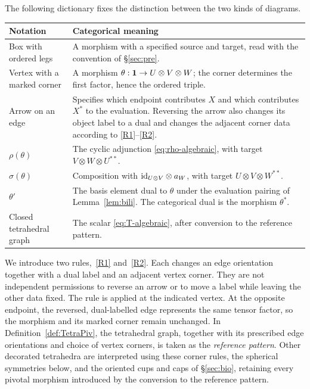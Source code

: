 \documentclass{amsart}
\begin{document}
The following dictionary fixes the distinction between the two kinds of diagrams.
\begin{center}
\renewcommand{\arraystretch}{1.22}
\begin{tabular}{p{}p{}}
\hline
Notation & Categorical meaning \\
\hline
Box with ordered legs & A morphism with a specified source and target, read with the convention of \S\ref{sec:pre}. \\
Vertex with a marked corner & A morphism $\theta:{\bf 1}\to U\otimes V\otimes W$; the corner determines the first factor, hence the ordered triple. \\
Arrow on an edge & Specifies which endpoint contributes $X$ and which contributes $X^*$ to the evaluation. Reversing the arrow also changes its object label to a dual and changes the adjacent corner data according to \eqref{R1}--\eqref{R2}. \\
$\rho(\theta)$ & The cyclic adjunction \eqref{eq:rho-algebraic}, with target $V\otimes W\otimes U^{**}$. \\
$\sigma(\theta)$ & Composition with $\mathrm{id}_{U\otimes V}\otimes a_W$, with target $U\otimes V\otimes W^{**}$. \\
$\theta'$ & The basis element dual to $\theta$ under the evaluation pairing of Lemma~\ref{lem:bili}. The categorical dual is the morphism $\theta^*$. \\
Closed tetrahedral graph & The scalar \eqref{eq:T-algebraic}, after conversion to the reference pattern. \\
\hline
\end{tabular}
\end{center}

We introduce two rules,~\eqref{R1} and~\eqref{R2}. Each changes an edge orientation together with a dual label and an adjacent vertex corner. They are not independent permissions to reverse an arrow or to move a label while leaving the other data fixed. The rule is applied at the indicated vertex. At the opposite endpoint, the reversed, dual-labelled edge represents the same tensor factor, so the morphism and its marked corner remain unchanged.
In Definition~\ref{def:TetraPiv}, the tetrahedral graph, together with its prescribed edge orientations and choice of vertex corners, is taken as the \emph{reference pattern}. Other decorated tetrahedra are interpreted using these corner rules, the spherical symmetries below, and the oriented cups and caps of \S\ref{sec:bio}, retaining every pivotal morphism introduced by the conversion to the reference pattern.
\end{document}
